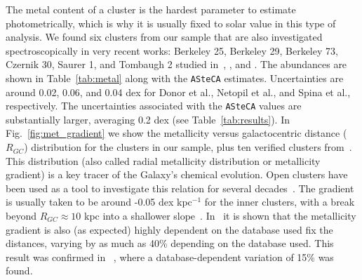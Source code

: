 \documentclass{aa}
\begin{document}
  The metal content of a cluster is the hardest parameter to estimate
  photometrically, which is why it is usually fixed to solar value in this
  type of analysis.
  We found six clusters from our sample that are also investigated
  spectroscopically in very recent works: Berkeley 25, Berkeley 29,
  Berkeley 73, Czernik 30, Saurer 1, and Tombaugh 2 studied
  in~\cite{Donor_2020}, \cite{Netopil_2022}, and \cite{Spina_2021}. The
  abundances are shown in Table~\ref{tab:metal} along with the \texttt{ASteCA}
  estimates. Uncertainties are around 0.02, 0.06, and 0.04 dex for Donor et
  al., Netopil et al., and Spina et al., respectively.
  The uncertainties associated with the \texttt{ASteCA} values are substantially
  larger, averaging 0.2 dex (see Table~\ref{tab:results}).
  In Fig.~\ref{fig:met_gradient} we show the metallicity versus
  galactocentric distance ($R_{GC}$) distribution for the clusters in our
  sample, plus ten verified clusters from~\cite{Perren_2020}.
  This distribution (also called radial metallicity distribution or
  metallicity gradient) is a key tracer of the Galaxy's chemical evolution.
  Open clusters have been used as a tool to investigate this relation for several
  decades~\citep{Janes_1979}. The gradient is usually taken to be around -0.05
  dex kpc$^{-1}$ for the inner clusters, with a break beyond $R_{GC}\approx10$
  kpc into a shallower slope~\citep{Donor_2020}. In~\cite{Donor_2018} it is
   shown that the metallicity gradient is also (as expected) highly
  dependent on the database used fix the distances, varying by as much as 40\%
  depending on the  database used. This result was confirmed in~
  \cite{Donor_2020}, where a database-dependent variation of  15\% was found.

\end{document}
